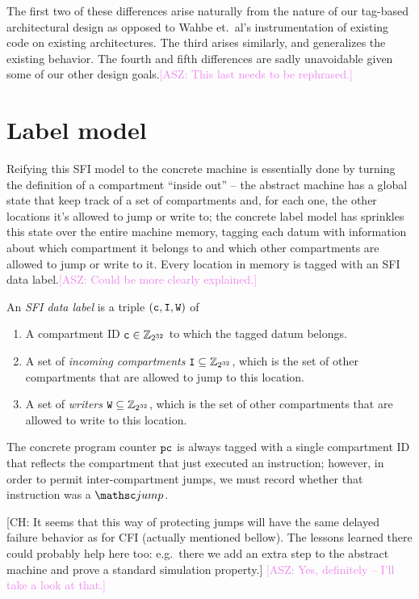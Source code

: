 \documentclass[12pt]{amsart}
\newif\ifdraft\drafttrue
\newcommand{\asz}[1]{\ifdraft\textcolor{violet}{[ASZ: #1]}\fi}
\newcommand*{\term}[1]{\emph{#1}}
\newcommand*{\Z}{\mathbb{Z}}
\newcommand{\comm}[3]{\ifdraft\textcolor{#1}{[#2: #3]}\fi}
\newcommand{\ch}[1]{\comm{dkgreen}{CH}{#1}} %
\begin{document}
The first two of these differences arise naturally from the nature of our
tag-based architectural design as opposed to Wahbe et.\ al's instrumentation of
existing code on existing architectures.  The third arises similarly, and
generalizes the existing behavior.  The fourth and fifth differences are sadly
unavoidable given some of our other design goals.\asz{This last needs to be
  rephrased.}

\section{Label model}

Reifying this SFI model to the concrete machine is essentially done by turning
the definition of a compartment ``inside out'' -- the abstract machine has a
global state that keep track of a set of compartments and, for each one, the
other locations it's allowed to jump or write to; the concrete label model has
sprinkles this state over the entire machine memory, tagging each datum with
information about which compartment it belongs to and which other compartments
are allowed to jump or write to it.  Every location in memory is tagged with an
SFI data label.\asz{Could be more clearly explained.}

\begin{definition}\label{def:sfi-data-label}
  An \term{SFI data label} is a triple $(\mathtt{c},\mathtt{I},\mathtt{W})$ of
  \begin{enumerate}
  \item A compartment ID $\Ccompartment \in \Z_{2^{32}}$ to which the tagged
    datum belongs.
  \item A set of \term{incoming compartments} $\CIncoming \subseteq
    \Z_{2^{32}}$, which is the set of other compartments that are allowed to
    jump to this location.
  \item A set of \term{writers} $\CWriters \subseteq \Z_{2^{32}}$, which is the
    set of other compartments that are allowed to write to this location.
  \end{enumerate}
\end{definition}

The concrete program counter $\mathtt{pc}$ is always tagged with a single compartment
ID that reflects the compartment that just executed an instruction; however, in
order to permit inter-compartment jumps, we must record whether that instruction
was a $\opcode{jump}$.

\ch{It seems that this way of protecting jumps will have the same
  delayed failure behavior as for CFI (actually mentioned bellow). The
  lessons learned there could probably help here too: e.g.\ there we
  add an extra step to the abstract machine and prove a standard
  simulation property.}%
\asz{Yes, definitely -- I'll take a look at that.}
\end{document}
